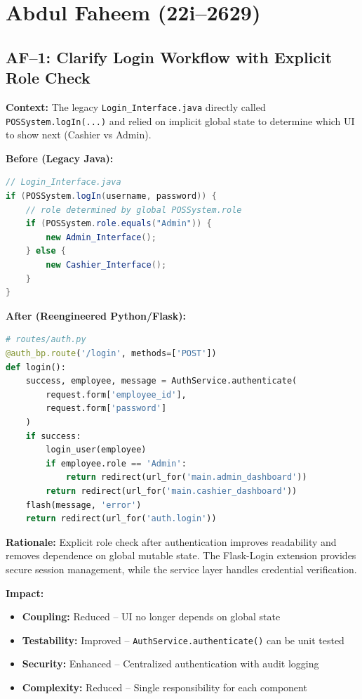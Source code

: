 \section{Abdul Faheem (22i--2629)}

\subsection{AF--1: Clarify Login Workflow with Explicit Role Check}

\textbf{Context:}
The legacy \texttt{Login\_Interface.java} directly called
\texttt{POSSystem.logIn(...)} and relied on implicit global state to
determine which UI to show next (Cashier vs Admin).

\textbf{Before (Legacy Java):}
\begin{lstlisting}[language=Java]
// Login_Interface.java
if (POSSystem.logIn(username, password)) {
    // role determined by global POSSystem.role
    if (POSSystem.role.equals("Admin")) {
        new Admin_Interface();
    } else {
        new Cashier_Interface();
    }
}
\end{lstlisting}

\textbf{After (Reengineered Python/Flask):}
\begin{lstlisting}[language=Python]
# routes/auth.py
@auth_bp.route('/login', methods=['POST'])
def login():
    success, employee, message = AuthService.authenticate(
        request.form['employee_id'],
        request.form['password']
    )
    if success:
        login_user(employee)
        if employee.role == 'Admin':
            return redirect(url_for('main.admin_dashboard'))
        return redirect(url_for('main.cashier_dashboard'))
    flash(message, 'error')
    return redirect(url_for('auth.login'))
\end{lstlisting}

\textbf{Rationale:}
Explicit role check after authentication improves readability and removes
dependence on global mutable state. The Flask-Login extension provides
secure session management, while the service layer handles credential
verification.

\textbf{Impact:}
\begin{itemize}
  \item \textbf{Coupling:} Reduced -- UI no longer depends on global state
  \item \textbf{Testability:} Improved -- \texttt{AuthService.authenticate()} can be unit tested
  \item \textbf{Security:} Enhanced -- Centralized authentication with audit logging
  \item \textbf{Complexity:} Reduced -- Single responsibility for each component
\end{itemize}

